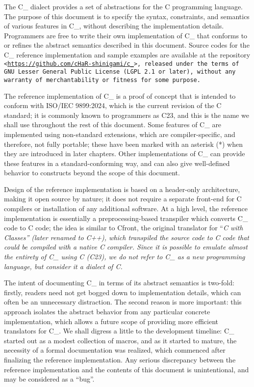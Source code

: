 \def\Section#1{\section{#1}}

The C\_ dialect provides a set of abstractions for the C programming language.
The purpose of this document is to specify the syntax, constraints, and semantics
of various features in C\_, without describing the implementation details.
Programmers are free to write their own implementation of C\_ that
conforms to or refines the abstract semantics described in this document.
Source codes for the C\_ reference implementation and sample examples are
available at the repository \tt{<}\url{https://github.com/cHaR-shinigami/c_}\tt{>},
released under the terms of GNU Lesser General Public License (LGPL 2.1 or later),
without any warranty of merchantability or fitness for some purpose.

The reference implementation of C\_ is a proof of concept that is intended to
conform with ISO/IEC 9899:2024, which is the current revision of the C standard;
it is commonly known to programmers as C23,
and this is the name we shall use throughout the rest of this document.
Some features of C\_ are implemented using non-standard extensions,
which are compiler-specific, and therefore, not fully portable; these have
been marked with an asterisk (*) when they are introduced in later chapters.
Other implementations of C\_ can provide these features
in a standard-conforming way, and can also give well-defined
behavior to constructs beyond the scope of this document.

Design of the reference implementation is based on a header-only architecture,
making it open source by nature; it does not require a separate
front-end for C compilers or installation of any additional software.
At a high level, the reference implementation is essentially a
preprocessing-based transpiler which converts C\_ code to C code;
the idea is similar to Cfront, the original translator for
``\it{C with Classes}'' (later renamed to C++), which transpiled the
source code  to C code that could be compiled with a native C compiler.
Since it is possible to emulate almost the entirety of C\_ using C (C23), we do
not refer to C\_ as a new programming language, but consider it a dialect of C.

The intent of documenting C\_ in terms of its abstract semantics is two-fold:
firstly, readers need not get bogged down to implementation details,
which can often be an unnecessary distraction.
The second reason is more important: this approach isolates the
abstract behavior from any particular concrete implementation,
which allows a future scope of providing more efficient translators for C\_.
We shall digress a little to the development timeline:
C\_ started out as a modest collection of macros, and as it started to mature,
the necessity of a formal documentation was realized,
which commenced after finalizing the reference implementation.
Any serious discrepancy between the reference implementation and the contents
of this document is unintentional, and may be considered as a ``bug''.

